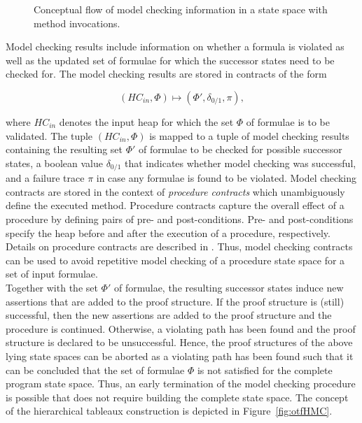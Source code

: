 \documentclass[a4paper, 12pt, twoside]{report}
\begin{document}
\begin{figure}
\begin{center}
{\begin{tikzpicture}
				\end{tikzpicture}}
			\caption{Conceptual flow of model checking information in a state space with method invocations.}\label{fig:otf_hierarchy}
		\end{center}
	\end{figure}	
	
	Model checking results include information on whether a formula is violated as well as the updated set of formulae for which the successor states need to be checked for. The model checking results are stored in contracts of the form
	
	\[(HC_{in}, \Phi) \mapsto (\Phi', \delta_{0/1}, \pi),\]
	
	where $HC_{in}$ denotes the input heap for which the set $\Phi$ of formulae is to be validated. The tuple $(HC_{in}, \Phi)$ is mapped to a tuple of model checking results containing the resulting set $\Phi'$ of formulae to be checked for possible successor states, a boolean value $\delta_{0/1}$ that indicates whether model checking was successful, and a failure trace $\pi$ in case any formulae is found to be violated. Model checking contracts are stored in the context of \textit{procedure contracts} which unambiguously define the executed method. Procedure contracts capture the overall effect of a procedure by defining pairs of pre- and post-conditions. Pre- and post-conditions specify the heap before and after the execution of a procedure, respectively. Details on procedure contracts are described in \cite{jansen2014generating}. Thus, model checking contracts can be used to avoid repetitive model checking of a procedure state space for a set of input formulae.\\
	
	Together with the set $\Phi'$ of formulae, the resulting successor states induce new assertions that are added to the proof structure. If the proof structure is (still) successful, then the new assertions are added to the proof structure and the procedure is continued. Otherwise, a violating path has been found and the proof structure is declared to be unsuccessful. Hence, the proof structures of the above lying state spaces can be aborted as a violating path has been found such that it can be concluded that the set of formulae $\Phi$ is not satisfied for the complete program state space. Thus, an early termination of the model checking procedure is possible that does not require building the complete state space. The concept of the hierarchical tableaux construction is depicted in Figure~\ref{fig:otfHMC}. \\
	
\end{document}
